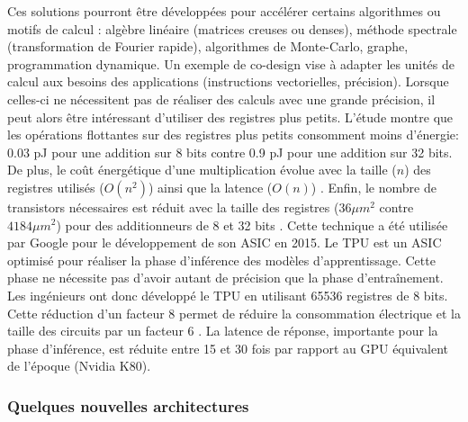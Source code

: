         Ces solutions pourront être développées pour accélérer certains algorithmes ou motifs de calcul \cite{asanovic2006landscape}: algèbre linéaire (matrices creuses ou denses), méthode spectrale (transformation de Fourier rapide), algorithmes de Monte-Carlo, graphe, programmation dynamique. Un exemple de co-design vise à adapter les unités de calcul aux besoins des applications (instructions vectorielles, précision). Lorsque celles-ci ne nécessitent pas de réaliser des calculs avec une grande précision, il peut alors être intéressant d’utiliser des registres plus petits. L’étude \cite{Horowitz2014} montre que les opérations flottantes sur des registres plus petits consomment moins d’énergie: 0.03 pJ pour une addition sur 8 bits contre 0.9 pJ pour une addition sur 32 bits. De plus, le coût énergétique d’une multiplication évolue avec la taille ($n$) des registres utilisés ($O(n^2)$) ainsi que la latence ($O(n)$) \cite{Sze2017}. Enfin, le nombre de transistors nécessaires est réduit avec la taille des registres ($36 \mu m^2$ contre $4184 \mu m^2$) pour des additionneurs de 8 et 32 bits \cite{Horowitz2014}. Cette technique a été utilisée par Google pour le développement de son ASIC en 2015. Le TPU est un ASIC optimisé pour réaliser la phase d'inférence des modèles d'apprentissage. Cette phase ne nécessite pas d'avoir autant de précision que la phase d'entraînement. Les ingénieurs ont donc développé le TPU en utilisant 65536 registres de 8 bits. Cette réduction d'un facteur 8 permet de réduire la consommation électrique et la taille des circuits par un facteur 6 \cite{Jouppi2017}. La latence de réponse, importante pour la phase d'inférence, est réduite entre 15 et 30 fois par rapport au GPU équivalent de l'époque (Nvidia K80).
            
          
            
    
        
    \subsubsection{Quelques nouvelles architectures}\label{sec:new_arch}
    
